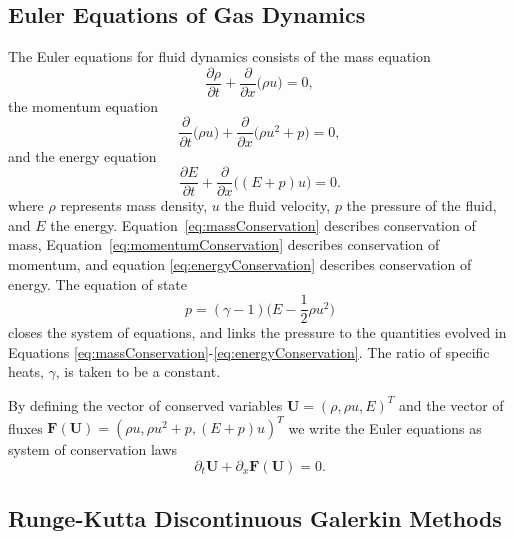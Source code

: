 \documentclass[10pt]{article}
\begin{document}
\subsection{Euler Equations of Gas Dynamics}

The Euler equations for fluid dynamics \citep[see, e.g.,][for details]{Leveque2002} consists of the mass equation
\begin{equation}
  \frac{\partial \rho}{\partial t}  
  + \frac{\partial}{\partial x} \Big(\rho u\Big) = 0,
  \label{eq:massConservation}
\end{equation}
the momentum equation
\begin{equation}
  \frac{\partial}{\partial t} \Big(\rho u\Big)
  + \frac{\partial}{\partial x} \Big(\rho u^2 + p\Big) = 0,
  \label{eq:momentumConservation}
\end{equation}
and the energy equation
\begin{equation}
  \frac{\partial E}{\partial t}
  + \frac{\partial}{\partial x} \Big((E + p) u\Big) = 0.  
  \label{eq:energyConservation}
\end{equation}
where $\rho$ represents mass density, $u$ the fluid velocity, $p$ the pressure of the fluid, and $E$ the energy.  
Equation~\eqref{eq:massConservation} describes conservation of mass, Equation~\eqref{eq:momentumConservation} describes conservation of momentum, and equation \eqref{eq:energyConservation} describes conservation of energy.
The equation of state
\begin{equation}
  p = (\gamma - 1)
  \Big(E - \frac{1}{2} \rho u^2 \Big)
  \label{eq:eos}
\end{equation}
closes the system of equations, and links the pressure to the quantities evolved in Equations \eqref{eq:massConservation}-\eqref{eq:energyConservation}. 
The ratio of specific heats, $\gamma$, is taken to be a constant.  

By defining the vector of conserved variables $\boldsymbol{U}=(\rho,\rho u,E)^{T}$ and the vector of fluxes $\boldsymbol{F}(\boldsymbol{U})=(\rho u,\rho u^{2}+p,(E+p)u)^{T}$ we write the Euler equations as system of conservation laws
\begin{equation}
  \partial_{t}\boldsymbol{U}
  +\partial_{x}\boldsymbol{F}(\boldsymbol{U})
  =0.
\end{equation}

\subsection{Runge-Kutta Discontinuous Galerkin Methods}
\end{document}
